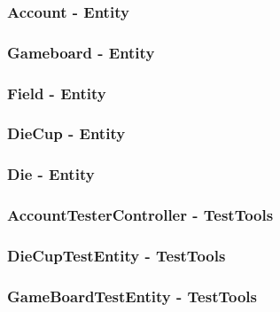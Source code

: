 \documentclass{article}
\begin{document}
\subsubsection{Account - Entity}

\subsubsection{Gameboard - Entity}

\subsubsection{Field - Entity}

\subsubsection{DieCup - Entity}

\subsubsection{Die - Entity}

\subsubsection{AccountTesterController - TestTools}

\subsubsection{DieCupTestEntity - TestTools}

\subsubsection{GameBoardTestEntity - TestTools}

\end{document}
